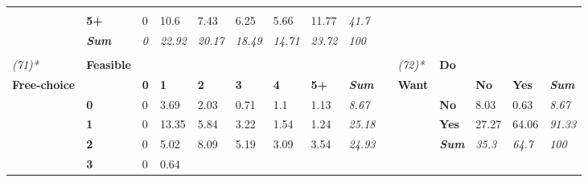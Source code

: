 \begin{table}
{\begin{threeparttable}
\begin{tabular}{lllllllllllllll}
   &
  \textit{} \\
 &
  \textbf{5+} &
  \cellcolor[HTML]{FFFFFF}0 &
  \cellcolor[HTML]{AFAFAF}10.6 &
  \cellcolor[HTML]{C7C7C7}7.43 &
  \cellcolor[HTML]{D0D0D0}6.25 &
  \cellcolor[HTML]{D5D5D5}5.66 &
  \cellcolor[HTML]{A6A6A6}11.77 &
  \textit{41.7} &
   &
   &
   &
   &
   &
  \textit{} \\
\textit{} &
  \textit{\textbf{Sum}} &
  \textit{0} &
  \textit{22.92} &
  \textit{20.17} &
  \textit{18.49} &
  \textit{14.71} &
  \textit{23.72} &
  \textit{100} &
  \textit{} &
  \textit{} &
  \textit{} &
  \textit{} &
  \textit{} &
  \textit{} \\
\textit{} &
  \textit{\textbf{}} &
  \textit{} &
  \textit{} &
  \textit{} &
  \textit{} &
  \textit{} &
  \textit{} &
  \textit{} &
  \textit{} &
  \textit{} &
  \textit{} &
  \textit{} &
  \textit{} &
  \textit{} \\
\textit{(71)*} &
  \textbf{Feasible} &
   &
   &
   &
   &
   &
   &
  \textit{} &
   &
  \textit{(72)*} &
  \textbf{Do} &
   &
   &
  \textit{} \\
\textbf{Free-choice} &
   &
  \textbf{0} &
  \textbf{1} &
  \textbf{2} &
  \textbf{3} &
  \textbf{4} &
  \textbf{5+} &
  \textit{\textbf{Sum}} &
  \textbf{} &
  \textbf{Want} &
   &
  \textbf{No} &
  \textbf{Yes} &
  \textit{\textbf{Sum}} \\
 &
  \textbf{0} &
  \cellcolor[HTML]{FFFFFF}0 &
  \cellcolor[HTML]{E7E7E7}3.69 &
  \cellcolor[HTML]{F2F2F2}2.03 &
  \cellcolor[HTML]{FBFBFB}0.71 &
  \cellcolor[HTML]{F8F8F8}1.1 &
  \cellcolor[HTML]{F8F8F8}1.13 &
  \textit{8.67} &
   &
   &
  \textbf{No} &
  \cellcolor[HTML]{F5F5F5}8.03 &
  \cellcolor[HTML]{FFFFFF}0.63 &
  \textit{8.67} \\
 &
  \textbf{1} &
  \cellcolor[HTML]{FFFFFF}0 &
  \cellcolor[HTML]{A6A6A6}13.35 &
  \cellcolor[HTML]{D9D9D9}5.84 &
  \cellcolor[HTML]{EAEAEA}3.22 &
  \cellcolor[HTML]{F5F5F5}1.54 &
  \cellcolor[HTML]{F7F7F7}1.24 &
  \textit{25.18} &
   &
   &
  \textbf{Yes} &
  \cellcolor[HTML]{DADADA}27.27 &
  \cellcolor[HTML]{A6A6A6}64.06 &
  \textit{91.33} \\
 &
  \textbf{2} &
  \cellcolor[HTML]{FFFFFF}0 &
  \cellcolor[HTML]{DEDEDE}5.02 &
  \cellcolor[HTML]{CACACA}8.09 &
  \cellcolor[HTML]{DDDDDD}5.19 &
  \cellcolor[HTML]{EBEBEB}3.09 &
  \cellcolor[HTML]{E8E8E8}3.54 &
  \textit{24.93} &
   &
   &
  \textit{\textbf{Sum}} &
  \textit{35.3} &
  \textit{64.7} &
  \textit{100} \\
 &
  \textbf{3} &
  \cellcolor[HTML]{FFFFFF}0 &
  \cellcolor[HTML]{FBFBFB}0.64 &

\end{tabular}
\end{threeparttable}}
\end{table}
